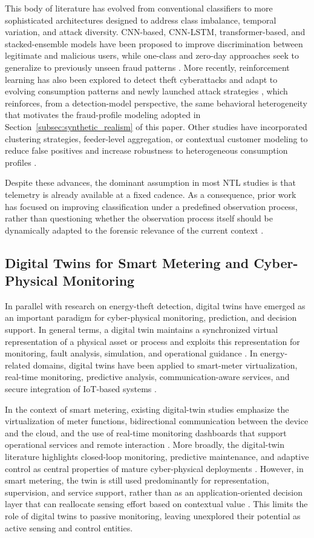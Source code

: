 \documentclass{ieeeaccess}
\begin{document}
This body of literature has evolved from conventional classifiers to more sophisticated architectures designed to address class imbalance, temporal variation, and attack diversity. CNN-based, CNN-LSTM, transformer-based, and stacked-ensemble models have been proposed to improve discrimination between legitimate and malicious users, while one-class and zero-day approaches seek to generalize to previously unseen fraud patterns \cite{b7, b8, b9, b10, b11, b12}. More recently, reinforcement learning has also been explored to detect theft cyberattacks and adapt to evolving consumption patterns and newly launched attack strategies \cite{b38}, which reinforces, from a detection-model perspective, the same behavioral heterogeneity that motivates the fraud-profile modeling adopted in Section~\ref{subsec:synthetic_realism} of this paper. Other studies have incorporated clustering strategies, feeder-level aggregation, or contextual customer modeling to reduce false positives and increase robustness to heterogeneous consumption profiles \cite{b13, b14}.

Despite these advances, the dominant assumption in most NTL studies is that telemetry is already available at a fixed cadence. As a consequence, prior work has focused on improving classification under a predefined observation process, rather than questioning whether the observation process itself should be dynamically adapted to the forensic relevance of the current context \cite{b2, b5, b6}.

\subsection{Digital Twins for Smart Metering and Cyber-Physical Monitoring}
In parallel with research on energy-theft detection, digital twins have emerged as an important paradigm for cyber-physical monitoring, prediction, and decision support. In general terms, a digital twin maintains a synchronized virtual representation of a physical asset or process and exploits this representation for monitoring, fault analysis, simulation, and operational guidance \cite{b15, b16, b17}. In energy-related domains, digital twins have been applied to smart-meter virtualization, real-time monitoring, predictive analysis, communication-aware services, and secure integration of IoT-based systems \cite{b18, b19, b20, b21, b22}.

In the context of smart metering, existing digital-twin studies emphasize the virtualization of meter functions, bidirectional communication between the device and the cloud, and the use of real-time monitoring dashboards that support operational services and remote interaction \cite{b19, b20, b22}. More broadly, the digital-twin literature highlights closed-loop monitoring, predictive maintenance, and adaptive control as central properties of mature cyber-physical deployments \cite{b23, b24, b25}. However, in smart metering, the twin is still used predominantly for representation, supervision, and service support, rather than as an application-oriented decision layer that can reallocate sensing effort based on contextual value \cite{b18, b20, b22}. This limits the role of digital twins to passive monitoring, leaving unexplored their potential as active sensing and control entities.
\end{document}
